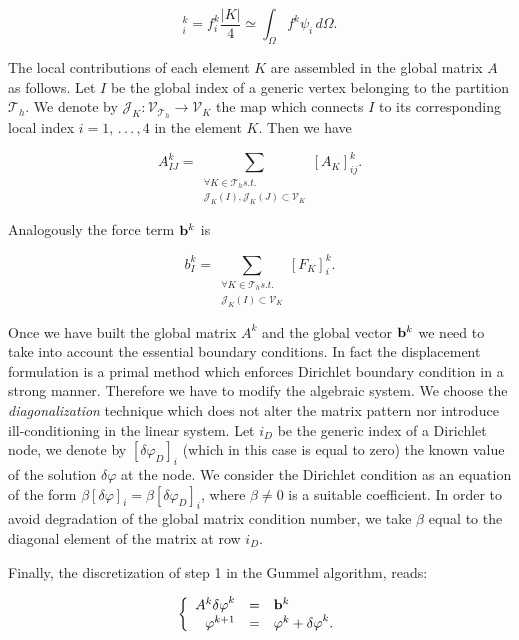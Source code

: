 \begin{equation}
[F_K]_i^k =  f^k_i \frac{|K|}{4} \simeq \int_{\Omega} f^k \psi_i \, d\Omega .
\end{equation}

The local contributions of each element $K$ are assembled in the global matrix $A$ as follows. Let $I$ be the global index of a generic vertex belonging to the partition $\mathcal{T}_h$. We denote by $\mathcal{J}_K: \mathcal{V}_{\mathcal{T}_h} \rightarrow \mathcal{V}_{K}$ the map which connects $I$ to its corresponding local index $i=1, \, . \, . \, . \, , 4$ in the element $K$. Then we have 

\begin{equation}
A_{IJ}^k = \sum_{\substack{\forall K \in \mathcal{T}_h s.t. \\ \mathcal{J}_K(I),\mathcal{J}_K(J) \subset \mathcal{V}_K}}
 [A_K]_{ij}^k.
\end{equation}

Analogously the force term $\mathbf{b}^{k}$ is

\begin{equation}
b_{I}^k = \sum_{\substack{\forall K \in \mathcal{T}_h s.t. \\ \mathcal{J}_K(I) \subset \mathcal{V}_K}}
 [F_K]_{i}^k.
\end{equation}

Once we have built the global matrix $A^k$ and the global vector $\mathbf{b}^k$ we need to take into account the essential boundary conditions. In fact the displacement formulation is a primal method which enforces Dirichlet boundary condition in a strong manner. Therefore we have to modify the algebraic system. We choose the \textit{diagonalization} technique which does not alter the matrix pattern nor introduce ill-conditioning in the linear system.  Let $i_D$ be the generic index of a Dirichlet node, we denote by $[\delta \varphi_{D}]_i$ (which in this case is equal to zero) the known value of the solution $\delta \varphi $ at the node. We consider the Dirichlet condition as an equation of the form $\beta [\delta \varphi]_i = \beta [\delta \varphi_{D}]_i$, where $\beta \neq 0$ is a suitable coefficient. In order to avoid degradation of the global matrix condition number, we take $\beta$ equal to the diagonal element of the matrix at row  $i_D$.

Finally, the discretization of step 1 in the Gummel algorithm, reads:

\begin{equation}
\label{eq: NLP discretizated}
\left\{
\begin{array}{rcl}
A^k\mathbf{\delta \varphi}^k & = & \mathbf{b}^k \\
\mathbf{\varphi}^{k+1} & = & \mathbf{\varphi}^k +  \mathbf{\delta \varphi}^k . 
\end{array}
\right.
\end{equation}

